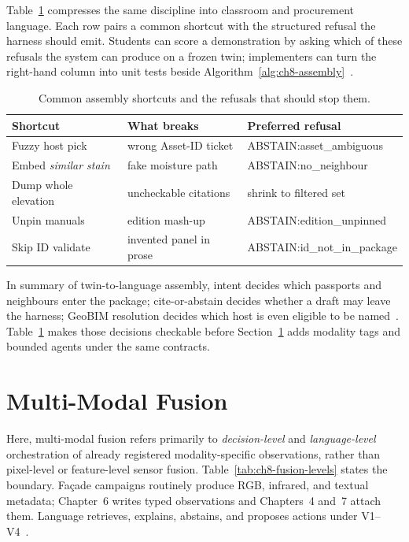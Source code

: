 Table~\ref{tab:ch8-assembly-fail} compresses the same discipline into classroom and procurement language. Each row pairs a common shortcut with the structured refusal the harness should emit. Students can score a demonstration by asking which of these refusals the system can produce on a frozen twin; implementers can turn the right-hand column into unit tests beside Algorithm~\ref{alg:ch8-assembly}~\cite{ji2023,peng2024,liang2023helm}.

\begin{table}[htbp]
\centering
\caption{Common assembly shortcuts and the refusals that should stop them.}
\label{tab:ch8-assembly-fail}
\begin{tabular}{llp{4.4cm}}
\toprule
Shortcut & What breaks & Preferred refusal \\
\midrule
Fuzzy host pick & wrong Asset-ID ticket & ABSTAIN:asset\_ambiguous \\
Embed \emph{similar stain} & fake moisture path & ABSTAIN:no\_neighbour \\
Dump whole elevation & uncheckable citations & shrink to filtered set \\
Unpin manuals & edition mash-up & ABSTAIN:edition\_unpinned \\
Skip ID validate & invented panel in prose & ABSTAIN:id\_not\_in\_package \\
\bottomrule
\end{tabular}
\end{table}

In summary of twin-to-language assembly, intent decides which passports and neighbours enter the package; cite-or-abstain decides whether a draft may leave the harness; GeoBIM resolution decides which host is even eligible to be named~\cite{lewis2020,peng2024,zhang2025}. Table~\ref{tab:ch8-assembly-fail} makes those decisions checkable before Section~\ref{sec:ch8-multimodal} adds modality tags and bounded agents under the same contracts.

\section{Multi-Modal Fusion}
\label{sec:ch8-multimodal}

Here, multi-modal fusion refers primarily to \emph{decision-level} and \emph{language-level} orchestration of already registered modality-specific observations, rather than pixel-level or feature-level sensor fusion. Table~\ref{tab:ch8-fusion-levels} states the boundary. Fa\c{c}ade campaigns routinely produce RGB, infrared, and textual metadata; Chapter~6 writes typed observations and Chapters~4 and~7 attach them. Language retrieves, explains, abstains, and proposes actions under V1--V4~\cite{zhao2024facade,zhao2026physical}.

